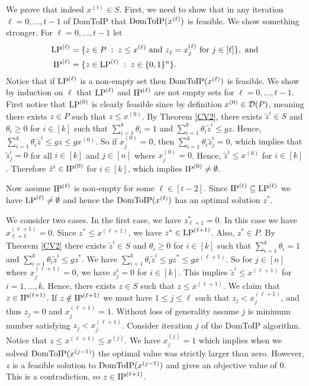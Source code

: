 We prove that indeed $x^{(t)}\in S$. First, we need to show that in any iteration $\ell=  0,\ldots,t-1$ of DomToIP that $\operatorname{{{DomToIP}}}(x^{(\ell)})$ is feasible. We show something stronger. For $\ell=0,\ldots,t-1$ let
\begin{align*}
\operatorname{LP}^{(\ell)}&= \{z\in P\; : \; z\leq x^{(\ell)} \mbox{ and } z_j=x_j^{(\ell)} \mbox{ for } j\in [\ell]\}, \text{ and}\\
\operatorname{IP}^{(\ell)}&= \{z\in \operatorname{LP}^{(\ell)}\; : \; z\in \{0,1\}^n\}.
\end{align*}
Notice that if $\operatorname{LP}^{(\ell)}$ is a non-empty set then $\operatorname{{{DomToIP}}}(x^{(\ell)})$ is feasible. We show by induction on $\ell$ that $\operatorname{LP}^{(\ell)}$ and $\operatorname{IP}^{(\ell)}$ are not empty sets for $\ell=0,\ldots,t-1$. First notice that $\operatorname{LP}^{(0)}$ is clearly feasible since by definition $x^{(0)}\in \operatorname{\mathcal{D}}(P)$, meaning there exists $z\in P$ such that $z\leq x^{(0)}$. By Theorem \ref{CV2}, there exists $\tilde{z}^i\in S$ and $\theta_i\geq 0$ for $i\in [k]$ such that $\sum_{i=1}^{k} \theta_i = 1$ and $\sum_{i=1}^{k}\theta_i \tilde{z}^i \leq gz$. Hence, $\sum_{i=1}^{k}\theta_i \tilde{z}^i \leq gz\leq gx^{(0)}$. So if $x^{(0)}_j=0$, then $ \sum_{i=1}^{k}\theta_i \tilde{z}_j^i =0$, which implies that $\tilde{z}^i_j=0$ for all $i\in [k]$ and $j\in [n]$ where $x^{(0)}_j=0$. Hence, $\tilde{z}^i\leq x^{(0)}$ for $i\in [k]$. Therefore $\tilde{z}^i\in \operatorname{IP}^{(0)}$ for $i\in [k]$, which implies $\operatorname{IP}^{(0)}\neq \emptyset$.

Now assume $\operatorname{IP}^{(\ell)}$ is non-empty for some $\ell \in [t-2]$. Since $\operatorname{IP}^{(\ell)}\subseteq\operatorname{LP}^{(\ell)}$ we have $\operatorname{LP}^{(\ell)}\neq \emptyset$ and hence the $\operatorname{{{DomToIP}}}(x^{(\ell)})$ has an optimal solution $z^*$.

We consider two cases. In the first case, we have $z^*_{\ell+1}=0$. In this case we have $x^{(\ell+1)}_{\ell+1}=0$. Since $z^*\leq x^{(\ell+1)}$, we have $z^*\in \operatorname{LP}^{(\ell+1)}$. Also, $z^*\in P$. By Theorem \ref{CV2} there exists $\tilde{z}^i\in S$ and $\theta_i\geq 0$ for $i\in [k]$ such that $\sum_{i=1}^{k} \theta_i = 1$ and  $\sum_{i=1}^{k}\theta_i \tilde{z}^i \leq gz^*$. We have $\sum_{i=1}^{k}\theta_i \tilde{z}^i \leq gz^*\leq gx^{(\ell+1)}$.
So for $j\in [n]$ where $x^{(\ell+1)}_j=0$, we have $z^i_j=0$ for $i\in [k]$. This implies $\tilde{z}^i\leq x^{(\ell+1)}$ for $i=1,\ldots,k$. Hence, there exists $z\in S$ such that $z\leq x^{(\ell+1)}$. We claim that $z\in \operatorname{IP}^{(\ell+1)}$. If $z\notin \operatorname{IP}^{(\ell+1)}$ we must have $1\leq j \leq \ell$ such that $z_j < x^{(\ell+1)}_{j}$, and thus $z_j = 0$ and $x^{(\ell+1)}_j=1$. Without loss of generality assume $j$ is minimum number satisfying $z_j < x^{(\ell+1)}_{j}$. Consider iteration $j$ of the DomToIP algorithm. Notice that $z\leq x^{(\ell+1)}\leq x^{(j)}$. We have $x^{(j)}_j=1$ which implies when we solved $\operatorname{{{DomToIP}}}(x^{(j-1)})$ the optimal value was strictly larger than zero. However, $z$ is a feasible solution to $\operatorname{{{DomToIP}}}(x^{(j-1)})$ and gives an objective value of 0. This is a contradiction, so $z\in \operatorname{IP}^{(\ell+1)}$.

